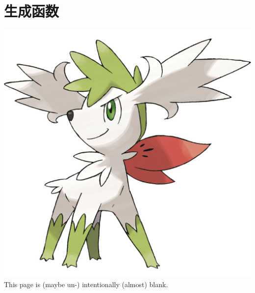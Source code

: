 \section{生成函数}
    \noindent
    \begin{center}
        \vfill
        \vfill
        \includegraphics[scale=0.2]{pictures/Shaymin.png}
        \vfill
        This page is (maybe un-) intentionally (almost) blank.
        \vfill
    \end{center}
    

